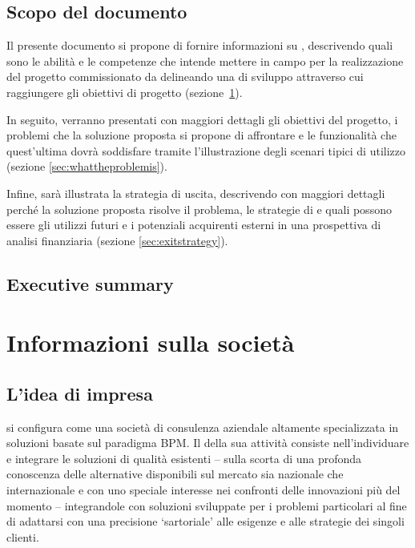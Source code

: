 \subsection{Scopo del documento}
Il presente documento si propone di fornire informazioni su \team, descrivendo quali sono le abilità e le competenze che intende mettere in campo per la realizzazione del progetto commissionato da \customer delineando una  di sviluppo attraverso cui raggiungere gli obiettivi di progetto (sezione~\ref{sec:whoweare}).

In seguito, verranno presentati con maggiori dettagli gli obiettivi del progetto, i problemi che la soluzione proposta si propone di affrontare e le funzionalità che quest'ultima dovrà soddisfare tramite l'illustrazione degli scenari tipici di utilizzo (sezione \ref{sec:whattheproblemis}).
 
Infine, sarà illustrata la strategia di uscita, descrivendo con maggiori dettagli perché la soluzione proposta risolve il problema, le strategie di \mktg e quali possono essere gli utilizzi futuri e i potenziali acquirenti esterni in una prospettiva di analisi finanziaria (sezione \ref{sec:exitstrategy}).

\subsection{Executive summary}


\clearpage

\section{Informazioni sulla società}\label{sec:whoweare}

\subsection{L'idea di impresa}
\team si configura come una società di consulenza aziendale altamente specializzata in soluzioni basate sul paradigma BPM\@. Il  della sua attività consiste nell'individuare e integrare le soluzioni di qualità esistenti -- sulla scorta di una profonda conoscenza delle alternative disponibili sul mercato sia nazionale che internazionale e con uno speciale interesse nei confronti delle innovazioni più  del momento -- integrandole con  soluzioni sviluppate  per i problemi particolari al fine di adattarsi con una precisione `sartoriale' alle esigenze e alle strategie dei singoli clienti.

